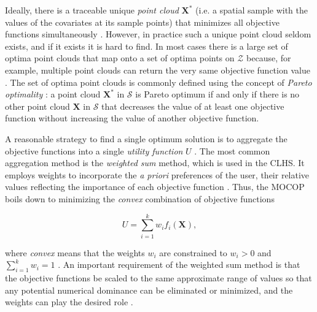 Ideally, there is a traceable unique \emph{point cloud} $\boldsymbol{X}^*$ (i.e. a spatial sample with the 
values of the covariates at its sample points) that minimizes all objective functions simultaneously 
\cite{MarlerEtAl2009}. However, in practice such a unique point cloud seldom exists, and if it exists it is 
hard to find. In most cases there is a large set of optima point clouds that map onto a set of optima points 
on $\mathcal{Z}$ because, for example, multiple point clouds can return the very same objective function value 
\cite{Arora2011}. The set of optima point clouds is commonly defined using the concept of \emph{Pareto 
optimality} \cite{MarlerEtAl2004}: a point cloud $\boldsymbol{X}^*$ in $\mathcal{S}$ is Pareto optimum if and 
only if there is no other point cloud $\boldsymbol{X}$ in $\mathcal{S}$ that decreases the value of at least 
one objective function without increasing the value of another objective function.

A reasonable strategy to find a single optimum solution is to aggregate the objective functions into a single 
\emph{utility function} $U$ \cite{MarlerEtAl2005}. The most common aggregation method is the \emph{weighted 
sum} method, which is used in the CLHS. It employs weights to incorporate the \emph{a priori} preferences of 
the user, their relative values reflecting the importance of each objective function \cite{MarlerEtAl2009}. 
Thus, the MOCOP boils down to minimizing the \emph{convex} combination of objective functions

\begin{equation}\label{eqn:chap08-utility} %
 U = \sum_{i=1}^{k} w_i f_i(\boldsymbol{X}),
\end{equation}

\noindent where \emph{convex} means that the weights $w_i$ are constrained to $w_i > 0$ and $\sum_{i=1}^{k} w_i 
= 1$ \cite{MarlerEtAl2005, MarlerEtAl2009}. An important requirement of the weighted sum method is that the 
objective functions be scaled to the same approximate range of values so that any potential numerical dominance 
can be eliminated or minimized, and the weights can play the desired role \cite{MarlerEtAl2005, 
MarlerEtAl2009}. 

